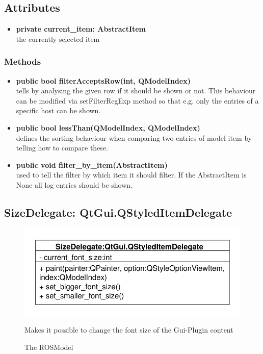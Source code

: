 \subsection{Attributes}
\begin{itemize}
  \item \textbf{private current\_item: AbstractItem}\\
  the currently selected item
\end{itemize}
\subsubsection{Methods}
\begin{itemize}
  \item \textbf{public bool filterAcceptsRow(int, QModelIndex)}\\
  tells by analysing the given row if it should be shown or not. This behaviour can be modified via setFilterRegExp method so that e.g. only the entries of a specific host can be shown.
  \item \textbf{public bool lessThan(QModelIndex, QModelIndex)}\\
    defines the sorting behaviour when comparing two entries of model item by telling how to compare these.
  \item \textbf{public void filter\_by\_item(AbstractItem)}\\
  used to tell the filter by which item it should filter. If the AbstractItem is None all log entries should be shown.
\end{itemize}

\subsection{SizeDelegate: QtGui.QStyledItemDelegate}
\begin{figure}[htbp]
	\begin{minipage}[t]{7cm}
		\vspace{0pt}
		\centering
		\includegraphics[scale=0.6]{./diagram_pictures/SizeDelegate.pdf}
		\caption{The ROSModel}
	\end{minipage}
	\hfill
	\begin{minipage}[t]{7cm}
		\vspace{10pt}
		Makes it possible to change the font size of the Gui-Plugin content
	\end{minipage}
\end{figure} 
